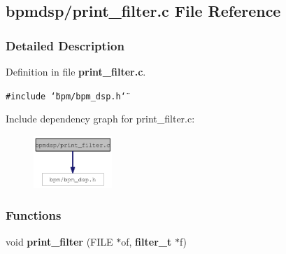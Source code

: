 \subsection{bpmdsp/print\_\-filter.c File Reference}
\label{print__filter_8c}


\subsubsection{Detailed Description}


Definition in file {\bf print\_\-filter.c}.

{\tt \#include \char`\"{}bpm/bpm\_\-dsp.h\char`\"{}}\par


Include dependency graph for print\_\-filter.c:\nopagebreak
\begin{figure}[H]
\begin{center}
\leavevmode
\includegraphics[width=84pt]{print__filter_8c__incl}
\end{center}
\end{figure}
\subsubsection*{Functions}
\begin{CompactItemize}
\item 
void {\bf print\_\-filter} (FILE $\ast$of, {\bf filter\_\-t} $\ast$f)
\end{CompactItemize}
